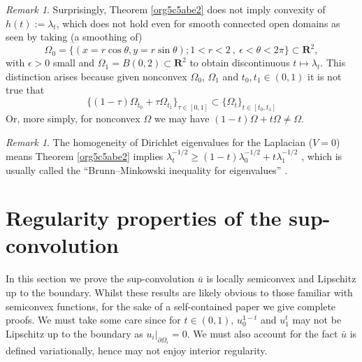 \documentclass[12pt]{amsart}
\theoremstyle{definition}
\theoremstyle{remark}
\newtheorem{rem}[thm]{Remark}
\begin{document}
\begin{rem} Surprisingly, Theorem \ref{org5c5abe2} does not imply convexity of $h(t):= \lambda_t$, which does not hold even for smooth connected open
domains as seen by taking (a smoothing of)
\[ \Omega_0 = \{(x=r\cos \theta, y = r\sin \theta) ; 1 < r < 2 \ , \ \epsilon < \theta < 2\pi\} \subset \mathbf{R}^{2},
\] with $\epsilon>0$ small and $\Omega_1 = B(0,2) \subset \mathbf{R}^{2}$ to obtain discontinuous
$t \mapsto \lambda_t$. This distinction arises because given nonconvex $\Omega_0$, $\Omega_1$ and $t_0,t_1 \in (0,1)$ it is not true that
\[ \{(1-\tau)\Omega_{t_0}+\tau \Omega_{t_1} \}_{\tau \in [0,1]} \subset \{\Omega_t\}_{t \in [t_0,t_1]}\]
Or, more simply, for nonconvex $\Omega$ we may have $(1-t)\Omega + t \Omega \neq \Omega$.
\end{rem}
\begin{rem} The homogeneity of Dirichlet eigenvalues for the Laplacian ($V=0$) means Theorem
 \ref{org5c5abe2} implies $\lambda_t^{-1/2} \geq (1-t)\lambda_0^{-1/2}+t \lambda_1^{-1/2}$ \cite[pg. 128]{zbMATH02181983}, which is usually called the ``Brunn--Minkowski inequality for eigenvalues'' .
\end{rem}


\section{Regularity properties of the sup-convolution}
\label{sec:org184251d} In this section we prove the sup-convolution $\bar{u}$  is locally semiconvex and Lipschitz up to the boundary. Whilst these results are likely obvious to those familiar with semiconvex functions, for the sake of a self-contained paper we give complete proofs. We must take some care since for \(t \in (0, 1)\), \(u_{0}^{1-t}\) and \(u_1^{t}\) may not be Lipschitz up to the boundary as \(u_{i}|_{\partial \Omega_i} = 0\). We must also account for the fact \(\bar{u}\) is defined variationally, hence may not enjoy interior regularity.
\end{document}
